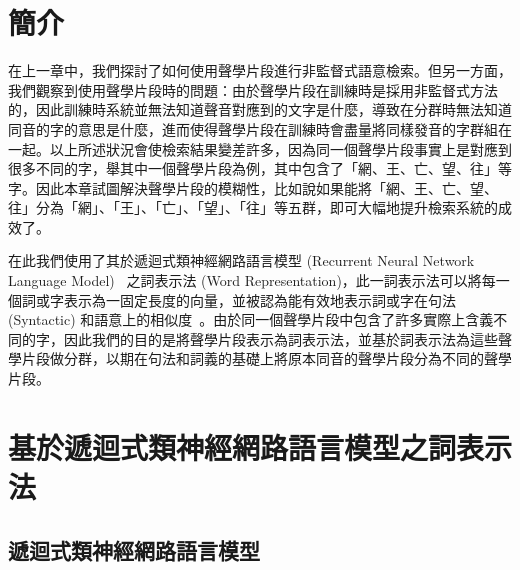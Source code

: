 \label{sec:chap5}
\section{簡介}
在上一章中，我們探討了如何使用聲學片段進行非監督式語意檢索。但另一方面，我們觀察到使用聲學片段時的問題：由於聲學片段在訓練時是採用非監督式方法的，因此訓練時系統並無法知道聲音對應到的文字是什麼，導致在分群時無法知道同音的字的意思是什麼，進而使得聲學片段在訓練時會盡量將同樣發音的字群組在一起。以上所述狀況會使檢索結果變差許多，因為同一個聲學片段事實上是對應到很多不同的字，舉其中一個聲學片段為例，其中包含了「網、王、亡、望、往」等字。因此本章試圖解決聲學片段的模糊性，比如說如果能將「網、王、亡、望、往」分為「網」、「王」、「亡」、「望」、「往」等五群，即可大幅地提升檢索系統的成效了。

在此我們使用了其於遞迴式類神經網路語言模型 (Recurrent Neural Network Language Model)~\cite{mikolov2010recurrent, mikolov2011extensions, mikolov2012context} 之詞表示法 (Word Representation)，此一詞表示法可以將每一個詞或字表示為一固定長度的向量，並被認為能有效地表示詞或字在句法 (Syntactic)
和語意上的相似度~\cite{mikolov2013linguistic}。由於同一個聲學片段中包含了許多實際上含義不同的字，因此我們的目的是將聲學片段表示為詞表示法，並基於詞表示法為這些聲學片段做分群，以期在句法和詞義的基礎上將原本同音的聲學片段分為不同的聲學片段。


\section{基於遞迴式類神經網路語言模型之詞表示法}

\subsection{遞迴式類神經網路語言模型}
